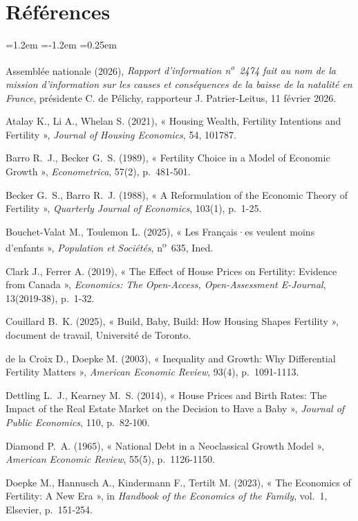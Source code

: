 \documentclass[11pt,a4paper]{article}
\theoremstyle{plain}
\theoremstyle{definition}
\theoremstyle{remark}
\begin{document}
\section*{Références}
\begin{list}{}{\leftmargin=1.2em \itemindent=-1.2em \itemsep=0.25em \parsep=0pt}\small
\item Assemblée nationale (2026), \emph{Rapport d'information n\textsuperscript{o}~2474 fait au nom de la mission d'information sur les causes et conséquences de la baisse de la natalité en France}, présidente C. de Pélichy, rapporteur J. Patrier-Leitus, 11 février 2026.
\item Atalay K., Li A., Whelan S. (2021), « Housing Wealth, Fertility Intentions and Fertility », \emph{Journal of Housing Economics}, 54, 101787.
\item Barro R.~J., Becker G.~S. (1989), « Fertility Choice in a Model of Economic Growth », \emph{Econometrica}, 57(2), p.~481-501.
\item Becker G.~S., Barro R.~J. (1988), « A Reformulation of the Economic Theory of Fertility », \emph{Quarterly Journal of Economics}, 103(1), p.~1-25.
\item Bouchet-Valat M., Toulemon L. (2025), « Les Français·es veulent moins d'enfants », \emph{Population et Sociétés}, n\textsuperscript{o}~635, Ined.
\item Clark J., Ferrer A. (2019), « The Effect of House Prices on Fertility: Evidence from Canada », \emph{Economics: The Open-Access, Open-Assessment E-Journal}, 13(2019-38), p.~1-32.
\item Couillard B.~K. (2025), « Build, Baby, Build: How Housing Shapes Fertility », document de travail, Université de Toronto.
\item de la Croix D., Doepke M. (2003), « Inequality and Growth: Why Differential Fertility Matters », \emph{American Economic Review}, 93(4), p.~1091-1113.
\item Dettling L.~J., Kearney M.~S. (2014), « House Prices and Birth Rates: The Impact of the Real Estate Market on the Decision to Have a Baby », \emph{Journal of Public Economics}, 110, p.~82-100.
\item Diamond P.~A. (1965), « National Debt in a Neoclassical Growth Model », \emph{American Economic Review}, 55(5), p.~1126-1150.
\item Doepke M., Hannusch A., Kindermann F., Tertilt M. (2023), « The Economics of Fertility: A New Era », in \emph{Handbook of the Economics of the Family}, vol.~1, Elsevier, p.~151-254.

\end{list}
\end{document}

